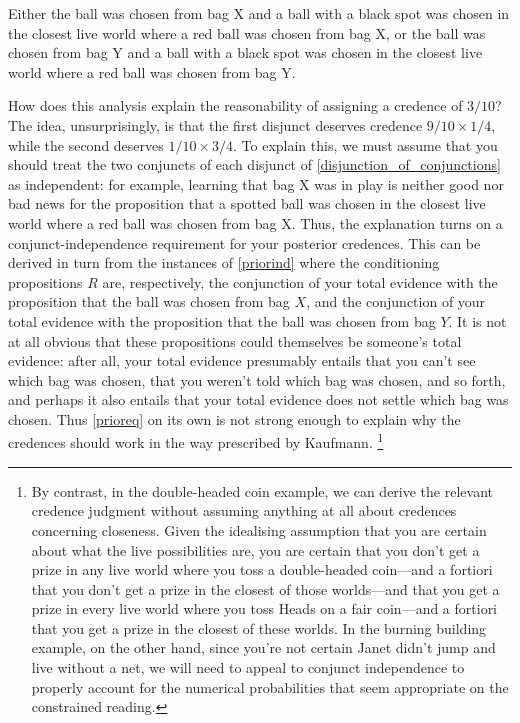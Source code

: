 \documentclass[If.tex]{subfiles}
\begin{document}
\begin{prop}
	\nitem \label{disjunction_of_conjunctions}
	Either the ball was chosen from bag X and a ball with a black spot was chosen in the closest live world where a red ball was chosen from bag X, or the ball was chosen from bag Y and a ball with a black spot was chosen in the closest live world where a red ball was chosen from bag Y.  
\end{prop}
How does this analysis explain the reasonability of assigning a credence of $3/10$?  The idea, unsurprisingly, is that the first disjunct deserves credence $9/10 × 1/4$, while the second deserves $1/10 × 3/4$.  To explain this, we must assume that you should treat the two conjuncts of each disjunct of \ref{disjunction_of_conjunctions} as independent: for example, learning that bag X was in play is neither good nor bad news for the proposition that a spotted ball was chosen in the closest live world where a red ball was chosen from bag X.  Thus, the explanation turns on a conjunct-independence requirement for your posterior credences.  This can be derived in turn from the instances of \ref{priorind} where the conditioning propositions $R$ are, respectively, the conjunction of your total evidence with the proposition that the ball was chosen from bag $X$, and the conjunction of your total evidence with the proposition that the ball was chosen from bag $Y$.  It is not at all obvious that these propositions could themselves be someone's total evidence: after all, your total evidence presumably entails that you can't see which bag was chosen, that you weren't told which bag was chosen, and so forth, and perhaps it also entails that your total evidence does not settle which bag was chosen.  Thus \ref{prioreq} on its own is not strong enough to explain why the credences should work in the way prescribed by Kaufmann.%
\footnote{By contrast, in the double-headed coin example, we can derive the relevant credence judgment without assuming anything at all about credences concerning closeness.  Given the idealising assumption that you are certain about what the live possibilities are, you are certain that you don't get a prize in any live world where you toss a double-headed coin---and a fortiori that you don't get a prize in the closest of those worlds---and that you get a prize in every live world where you toss Heads on a fair coin---and a fortiori that you get a prize in the closest of these worlds.  In the burning building example, on the other hand, since you're not certain Janet didn't jump and live without a net, we will need to appeal to conjunct independence to properly account for the numerical probabilities that seem appropriate on the constrained reading.}
\end{document}
